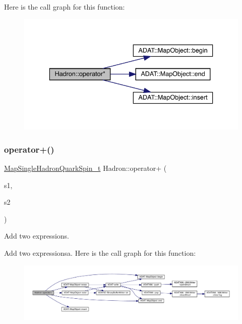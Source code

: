 Here is the call graph for this function\+:
\nopagebreak
\begin{figure}[H]
\begin{center}
\leavevmode
\includegraphics[width=336pt]{d1/daf/namespaceHadron_afeecee88605be038ceda273e796e53fd_cgraph}
\end{center}
\end{figure}
\mbox{\label{namespaceHadron_a9ca80acd77b748f912b330709f8c294a}} 
\subsubsection{\texorpdfstring{operator+()}{operator+()}\hspace{0.1cm}{\footnotesize\ttfamily [1/3]}}
{\footnotesize\ttfamily \mbox{\hyperlink{namespaceHadron_a22279e56b59508dc8dd2c8991dc911fd}{Map\+Single\+Hadron\+Quark\+Spin\+\_\+t}} Hadron\+::operator+ (\begin{DoxyParamCaption}\item[{const \mbox{\hyperlink{namespaceHadron_a22279e56b59508dc8dd2c8991dc911fd}{Map\+Single\+Hadron\+Quark\+Spin\+\_\+t}} \&}]{s1,  }\item[{const \mbox{\hyperlink{namespaceHadron_a22279e56b59508dc8dd2c8991dc911fd}{Map\+Single\+Hadron\+Quark\+Spin\+\_\+t}} \&}]{s2 }\end{DoxyParamCaption})}



Add two expressions. 

Add two expressionsa. Here is the call graph for this function\+:
\nopagebreak
\begin{figure}[H]
\begin{center}
\leavevmode
\includegraphics[width=350pt]{d1/daf/namespaceHadron_a9ca80acd77b748f912b330709f8c294a_cgraph}
\end{center}
\end{figure}
\mbox{\label{namespaceHadron_afa83538fb097946f87e6f98180c378b5}} 
